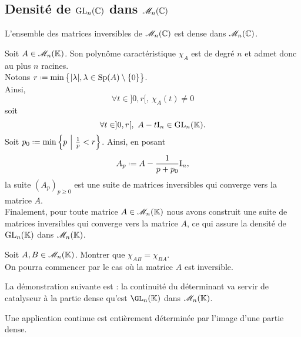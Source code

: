 \subsection{Densité de \texorpdfstring{$\mathrm{GL}_n(\mathbb{C})$}{GL_n(C)} dans \texorpdfstring{$\mathscr{M}_n(\mathbb{C})$}{M_n(C)}}

\begin{theo}{}
    L'ensemble des matrices inversibles de $\mathscr{M}_n(\mathbb{C})$ est dense dans $\mathscr{M}_n(\mathbb{C})$.
\end{theo}

\begin{marginfigure}[2cm]
    \centering
    
\end{marginfigure}

\begin{preuve}
    Soit $A \in \mathscr{M}_n(\mathbb{K})$. Son polynôme caractéristique $\chi_A$ est de degré $n$ et admet donc au plus $n$ racines. \\
    Notons $r \defeq \min \big\{ |\lambda|, \lambda \in \Sp(A) \setminus \{0\} \big\}$. \\
    Ainsi,
    $$\forall t \in ]0,r[,\ \chi_A(t) \not= 0$$ 
    soit 
    $$\forall t \in ]0,r[,\ A - t \mathrm{I}_n\in \mathrm{GL}_n(\mathbb{K}).$$
    Soit $p_0 \defeq \min \left\{ p\ \middle|\ \frac{1}{p} < r \right\}$. Ainsi, en posant
    $$A_p \defeq A - \frac{1}{p + p_0} \I_n,$$
    la suite $(A_p)_{p \geqslant 0}$ est une suite de matrices inversibles qui converge vers la matrice $A$. \\
    Finalement, pour toute matrice $A \in \mathscr{M}_n(\mathbb{K})$ nous avons construit une suite de matrices inversibles qui converge vers la matrice $A$, ce qui assure la densité de $\mathrm{GL}_n(\mathbb{K})$ dans $\mathscr{M}_n(\mathbb{K})$.
\end{preuve}

\begin{exercice}
    Soit $A, B \in \mathscr{M}_n(\mathbb{K})$. Montrer que $\chi_{AB}=\chi_{BA}$. \\
    On pourra commencer par le cas où la matrice $A$ est inversible.
\end{exercice}

La démonstration suivante est : la continuité du déterminant va servir de catalyseur à la partie dense qu'est $\GL_n(\K)$ dans $\mathscr{M}_n(\mathbb{K})$.

\begin{center}
    Une application continue est entièrement déterminée par l'image d'une partie dense.
\end{center}

